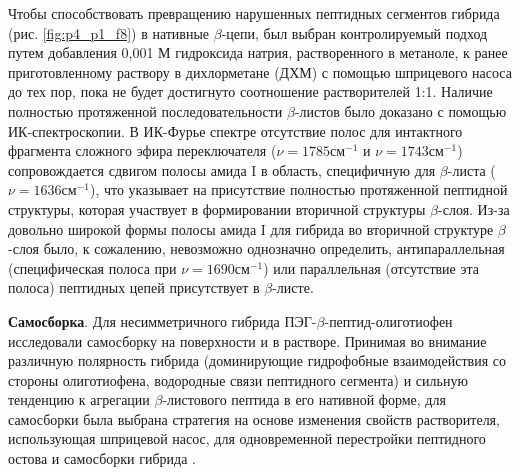     Чтобы способствовать превращению нарушенных пептидных сегментов гибрида (рис. \ref{fig:p4_p1_f8}) в нативные $\beta$-цепи, был выбран контролируемый подход путем добавления 0,001 М гидроксида натрия, растворенного в метаноле, к ранее приготовленному раствору в дихлорметане (ДХМ) с помощью шприцевого насоса до тех пор, пока не будет достигнуто соотношение растворителей 1:1. Наличие полностью протяженной последовательности $\beta$-листов было доказано с помощью ИК-спектроскопии. В ИК-Фурье спектре отсутствие полос для интактного фрагмента сложного эфира переключателя ($\nu = 1785 см^{-1}$ и $\nu = 1743 см^{-1}$) сопровождается сдвигом полосы амида I в область, специфичную для $\beta$-листа ($\nu = 1636 см^{-1}$), что указывает на присутствие полностью протяженной пептидной структуры, которая участвует в формировании вторичной структуры $\beta$-слоя. Из-за довольно широкой формы полосы амида I для гибрида во вторичной структуре $\beta$-слоя было, к сожалению, невозможно однозначно определить, антипараллельная (специфическая полоса при $\nu = 1690 см^{-1}$) или параллельная (отсутствие эта полоса) пептидных цепей присутствует в $\beta$-листе.
    
    \textbf{Самосборка}. Для несимметричного гибрида ПЭГ-$\beta$-пептид-олиготиофен исследовали самосборку на поверхности и в растворе. Принимая во внимание различную полярность гибрида (доминирующие гидрофобные взаимодействия со стороны олиготиофена, водородные связи пептидного сегмента) и сильную тенденцию к агрегации $\beta$-листового пептида в его нативной форме, для самосборки была выбрана стратегия на основе изменения свойств растворителя, использующая шприцевой насос, для одновременной перестройки пептидного остова и самосборки гибрида \cite{schillinger_oligothiophene_2009}.

